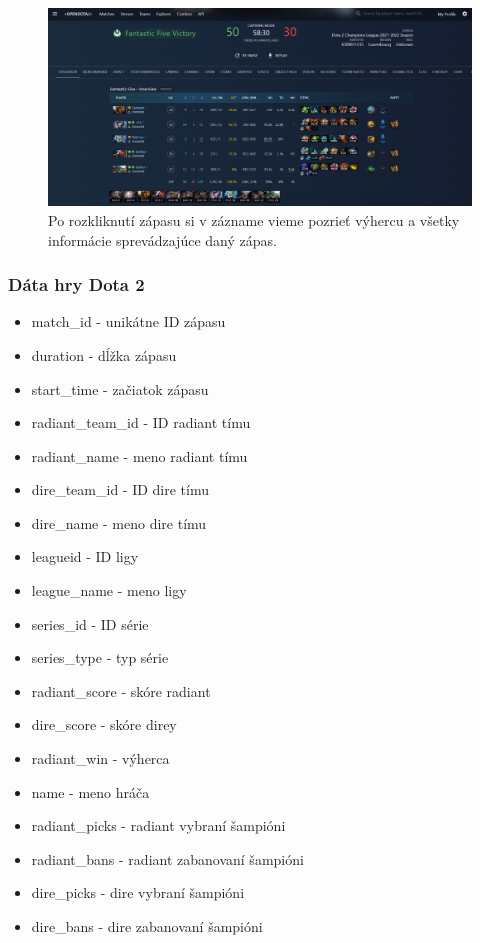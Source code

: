  \begin{figure}[h!]
	
	\includegraphics[width=.9\textwidth]{figures/dota2}
	\centering
	\caption{ Po rozkliknutí zápasu si v zázname vieme pozrieť výhercu a všetky informácie sprevádzajúce daný zápas. \label{dota2}}
	
\end{figure}

\subsubsection{Dáta hry Dota 2}

 \begin{itemize}
\item match\_id - unikátne ID zápasu 
\item duration - dĺžka zápasu 
\item start\_time - začiatok zápasu 
\item radiant\_team\_id - ID radiant tímu 
\item radiant\_name - meno radiant tímu 
\item dire\_team\_id - ID dire tímu 
\item dire\_name - meno dire tímu 
\item leagueid - ID ligy
\item league\_name - meno ligy
\item series\_id - ID série
\item series\_type - typ série
\item radiant\_score - skóre radiant
\item dire\_score - skóre direy
\item radiant\_win - výherca
\item name - meno hráča
\item radiant\_picks - radiant vybraní šampióni
\item radiant\_bans - radiant zabanovaní šampióni
\item dire\_picks - dire vybraní šampióni
\item dire\_bans - dire zabanovaní šampióni
\end{itemize}

